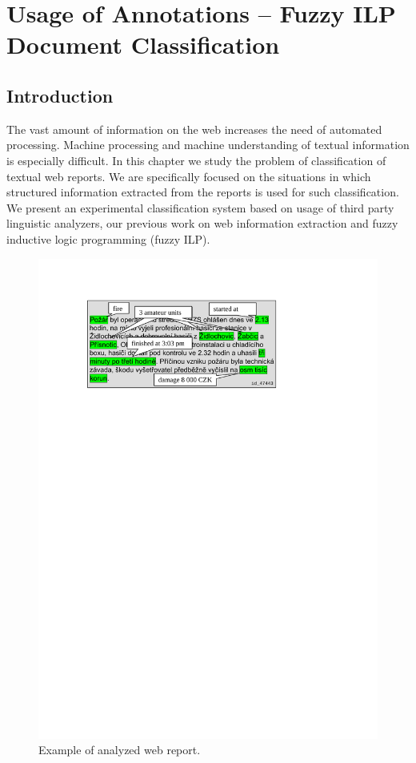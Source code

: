 \chapter{Usage of Annotations -- Fuzzy ILP Document Classification}

\graphicspath{{../img/ch80/}}


\section{Introduction}

The vast amount of information on the web increases the need of automated processing. Machine processing and machine understanding of textual information is especially difficult. In this chapter we study the problem of classification of textual web reports. We are specifically focused on the situations in which structured information extracted from the reports is used for such classification. We present an experimental classification system based on usage of third party linguistic analyzers, our previous work on web information extraction and fuzzy inductive logic programming (fuzzy ILP).

\begin{figure}
\centerline{\includegraphics[width=0.7\hsize]{message}}
\caption{Example of analyzed web report.}
\label{img:message}
\end{figure}


